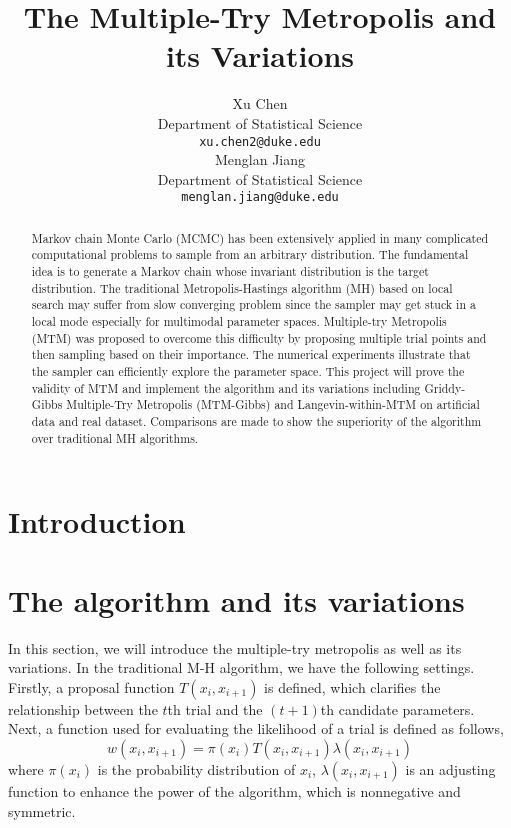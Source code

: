\documentclass{article} %
\title{The Multiple-Try Metropolis and its Variations}
\author{
Xu Chen\\
Department of Statistical Science\\
\texttt{xu.chen2@duke.edu} \\
\And
Menglan Jiang\\
Department of Statistical Science\\
\texttt{menglan.jiang@duke.edu}
}
\begin{document}
\maketitle

\begin{abstract}
Markov chain Monte Carlo (MCMC) has been extensively applied in many complicated computational problems to sample from an arbitrary distribution. The fundamental idea is to generate a Markov chain whose invariant distribution is the target distribution. The traditional Metropolis-Hastings algorithm (MH) based on local search may suffer from slow converging problem since the sampler may get stuck in a local mode especially for multimodal parameter spaces. Multiple-try Metropolis (MTM) was proposed to overcome this difficulty by proposing multiple trial points and then sampling based on their importance. The numerical experiments illustrate that the sampler can efficiently explore the parameter space. This project will prove the validity of MTM and implement the algorithm and its variations including Griddy-Gibbs Multiple-Try Metropolis (MTM-Gibbs) and Langevin-within-MTM on artificial data and real dataset. Comparisons are made to show the superiority of the algorithm over traditional MH algorithms.
\end{abstract}

\section{Introduction}



\section{The algorithm and its variations}
In this section, we will introduce the multiple-try metropolis as well as its variations. In the traditional M-H algorithm, we have the following settings. Firstly, a proposal function $T(x_i,x_{i+1})$ is defined, which clarifies the relationship between the $t$th trial and the $(t+1)$th candidate parameters. Next, a function used for evaluating the likelihood of a trial is defined as follows,
\begin{equation}
w(x_i,x_{i+1}) = \pi(x_i) T(x_i,x_{i+1}) \lambda (x_i,x_{i+1})
\end{equation}
where $\pi(x_i)$ is the probability distribution of $x_i$, $\lambda (x_i,x_{i+1})$ is an adjusting function to enhance the power of the algorithm, which is nonnegative and symmetric.
\end{document}
